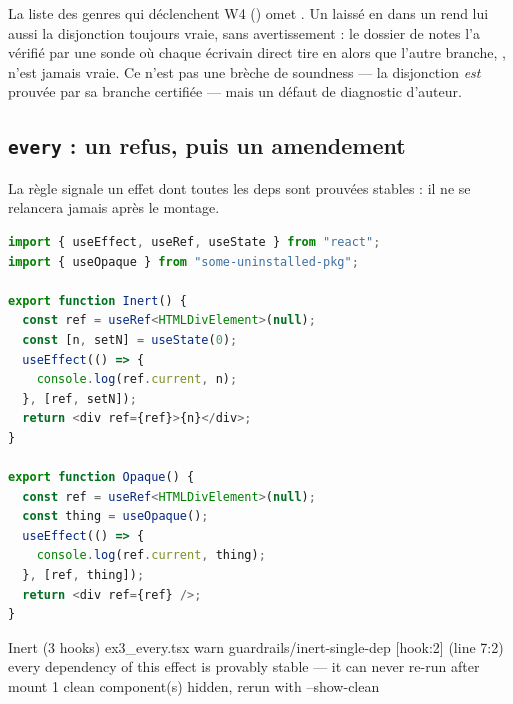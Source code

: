 \begin{piege}
La liste des genres qui déclenchent W4 () omet . Un  laissé en  dans un  rend lui aussi la disjonction toujours vraie, sans avertissement : le dossier de notes l'a vérifié par une sonde où chaque écrivain direct tire en \Error{} alors que l'autre branche, , n'est jamais vraie. Ce n'est pas une brèche de soundness --- la disjonction \emph{est} prouvée par sa branche certifiée --- mais un défaut de diagnostic d'auteur.
\end{piege}

\subsection{\texttt{every} : un refus, puis un amendement}

La règle  signale un effet dont toutes les deps sont prouvées stables : il ne se relancera jamais après le montage.



\begin{lstlisting}[language=TypeScript,caption={Des deps prouvées stables, et une dep inconnue (\file{/tmp/ch22/ex3\_every.tsx})},label={lst:decl-ex3}]
import { useEffect, useRef, useState } from "react";
import { useOpaque } from "some-uninstalled-pkg";

export function Inert() {
  const ref = useRef<HTMLDivElement>(null);
  const [n, setN] = useState(0);
  useEffect(() => {
    console.log(ref.current, n);
  }, [ref, setN]);
  return <div ref={ref}>{n}</div>;
}

export function Opaque() {
  const ref = useRef<HTMLDivElement>(null);
  const thing = useOpaque();
  useEffect(() => {
    console.log(ref.current, thing);
  }, [ref, thing]);
  return <div ref={ref} />;
}
\end{lstlisting}

\begin{sortie}
  Inert  (3 hooks)  ex3_every.tsx
    warn   guardrails/inert-single-dep  [hook:2]  (line 7:2)  every dependency of this effect is provably stable — it can never re-run after mount
   1 clean component(s) hidden, rerun with --show-clean
\end{sortie}

